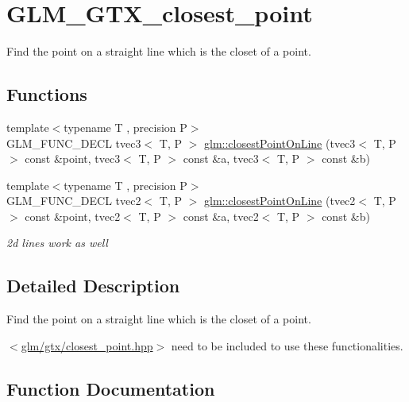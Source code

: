 \hypertarget{group__gtx__closest__point}{}\section{G\+L\+M\+\_\+\+G\+T\+X\+\_\+closest\+\_\+point}
\label{group__gtx__closest__point}


Find the point on a straight line which is the closet of a point.  


\subsection*{Functions}
\begin{DoxyCompactItemize}
\item 
{\footnotesize template$<$typename T , precision P$>$ }\\G\+L\+M\+\_\+\+F\+U\+N\+C\+\_\+\+D\+E\+C\+L tvec3$<$ T, P $>$ \hyperlink{group__gtx__closest__point_gac26353282a8213e469f5e33560c1200f}{glm\+::closest\+Point\+On\+Line} (tvec3$<$ T, P $>$ const \&point, tvec3$<$ T, P $>$ const \&a, tvec3$<$ T, P $>$ const \&b)
\item 
{\footnotesize template$<$typename T , precision P$>$ }\\G\+L\+M\+\_\+\+F\+U\+N\+C\+\_\+\+D\+E\+C\+L tvec2$<$ T, P $>$ \hyperlink{group__gtx__closest__point_gadc7010070bb0cacd284f560299b21660}{glm\+::closest\+Point\+On\+Line} (tvec2$<$ T, P $>$ const \&point, tvec2$<$ T, P $>$ const \&a, tvec2$<$ T, P $>$ const \&b)
\begin{DoxyCompactList}\small\item\em 2d lines work as well \end{DoxyCompactList}\end{DoxyCompactItemize}


\subsection{Detailed Description}
Find the point on a straight line which is the closet of a point. 

$<$\hyperlink{closest__point_8hpp}{glm/gtx/closest\+\_\+point.\+hpp}$>$ need to be included to use these functionalities. 

\subsection{Function Documentation}
\hypertarget{group__gtx__closest__point_gac26353282a8213e469f5e33560c1200f}{}
